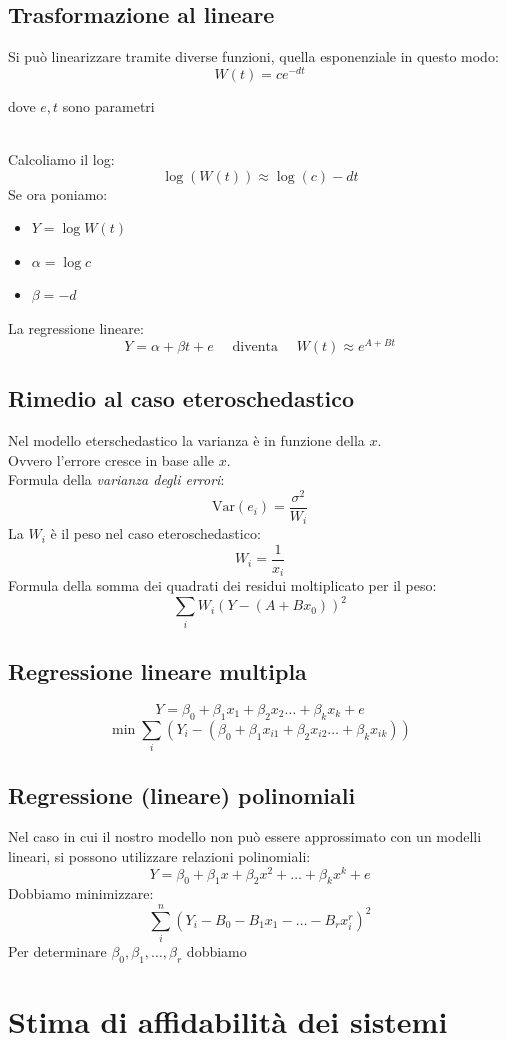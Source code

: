 \documentclass[]{article}
\begin{document}
    \subsection{Trasformazione al lineare}
    Si può linearizzare tramite diverse funzioni, quella esponenziale in questo modo:
    \[ W(t) = ce^{-dt}\]
    \centerline{dove $e, t$ sono parametri} \\[2ex]
    Calcoliamo il log:
    \[ \log({W}(t)) \approx \log{(c)}-dt \]
    Se ora poniamo:
    \begin{itemize}
        \item $Y = \log{W(t)}$
        \item $\alpha = \log{c}$
        \item $\beta = -d$
    \end{itemize}
    La regressione lineare:
    \[ Y = \alpha + \beta t + e \quad \text{ diventa } \quad W(t) \approx e^{A+Bt} \]
    \subsection{Rimedio al caso eteroschedastico}
    Nel modello eterschedastico la varianza è in funzione della $x$. \\
    Ovvero l'errore cresce in base alle $x$. \\[2ex]
    Formula della \textit{varianza degli errori}:
    \[ \text{Var}(e_i)=\frac{\sigma^2}{W_i} \]
    La $W_i$ è il peso nel caso eteroschedastico:
    \[ W_i=\frac{1}{x_i} \]
    Formula della somma dei quadrati dei residui moltiplicato per il peso:
    \[ \sum_iW_i(Y-(A+Bx_0))^2 \]
    \subsection{Regressione lineare multipla}
    \[ Y = \beta_0 + \beta_1 x_1 + \beta_2 x_2 \ldots + \beta_k x_k +e \]
    \[ \min\sum_i(Y_i -(\beta_0+\beta_1x_{i1} + \beta_2x_{i2} \ldots + \beta_kx_{ik})) \]
    \subsection{Regressione (lineare) polinomiali}
    Nel caso in cui il nostro modello non può essere approssimato con un modelli lineari, si possono utilizzare relazioni polinomiali:
    \[ Y = \beta_0 + \beta_1x+\beta_2x^2 +\ldots+\beta_kx^k + e \]
    Dobbiamo minimizzare:
    \[ \sum_i^n (Y_i-B_0-B_1x_1-\ldots-B_rx_i^r)^2 \]
    Per determinare $\beta_0, \beta_1, \ldots, \beta_r$ dobbiamo
    \section{Stima di affidabilità dei sistemi}
\end{document}
